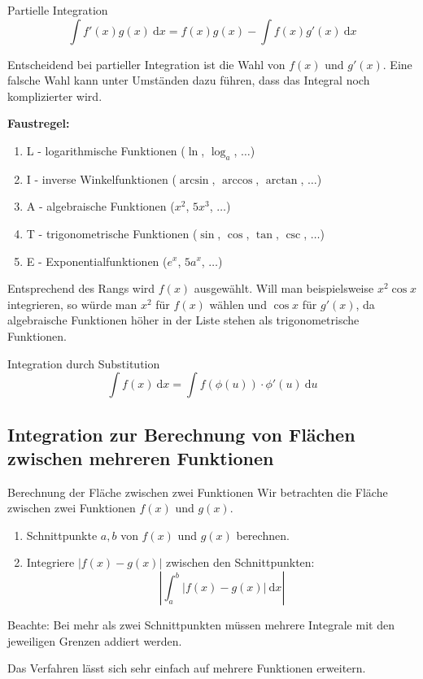 \documentclass[german]{../spicker}
\renewcommand{\abs}[1]{\left| #1 \right|}
\newcommand{\dx}{~\mathrm{d}x}
\newcommand{\du}{~\mathrm{d}u}
\begin{document}
\begin{bonus}{Partielle Integration}
    $$
        \int f'(x)g(x) \dx = f(x)g(x) - \int f(x) g'(x) \dx
    $$

    Entscheidend bei partieller Integration ist die Wahl von $f(x)$ und $g'(x)$.
    Eine falsche Wahl kann unter Umständen dazu führen, dass das Integral noch komplizierter wird.

    \textbf{Faustregel:}
    \begin{enumerate}
        \item L - logarithmische Funktionen ($\ln$, $\log_a$, $\ldots$)
        \item I - inverse Winkelfunktionen ($\arcsin$, $\arccos$, $\arctan$, $\ldots$)
        \item A - algebraische Funktionen ($x^2$, $5x^3$, $\ldots$)
        \item T - trigonometrische Funktionen ($\sin$, $\cos$, $\tan$, $\csc$, $\ldots$)
        \item E - Exponentialfunktionen ($e^x$, $5a^x$, $\ldots$)
    \end{enumerate}
    Entsprechend des Rangs wird $f(x)$ ausgewählt. Will man beispielsweise $x^2\cos x$ integrieren, so würde man $x^2$ für $f(x)$ wählen und $\cos x$ für $g'(x)$, da algebraische Funktionen höher in der Liste stehen als trigonometrische Funktionen.
\end{bonus}

\begin{bonus}{Integration durch Substitution}
    $$
        \int f(x)\dx = \int f(\phi(u)) \cdot \phi'(u) \du
    $$
\end{bonus}

\subsection{Integration zur Berechnung von Flächen zwischen mehreren Funktionen}

\begin{algo}{Berechnung der Fläche zwischen zwei Funktionen}
    Wir betrachten die Fläche zwischen zwei Funktionen $f(x)$ und $g(x)$.

    \begin{enumerate}
        \item Schnittpunkte $a, b$ von $f(x)$ und $g(x)$ berechnen.
        \item Integriere $\abs{f(x) - g(x)}$ zwischen den Schnittpunkten:
              $$
                  \abs{\int^b_a\abs{f(x) -g(x)} \dx}
              $$
    \end{enumerate}

    Beachte: Bei mehr als zwei Schnittpunkten müssen mehrere Integrale mit den jeweiligen Grenzen addiert werden.

    Das Verfahren lässt sich sehr einfach auf mehrere Funktionen erweitern.
\end{algo}
\end{document}
